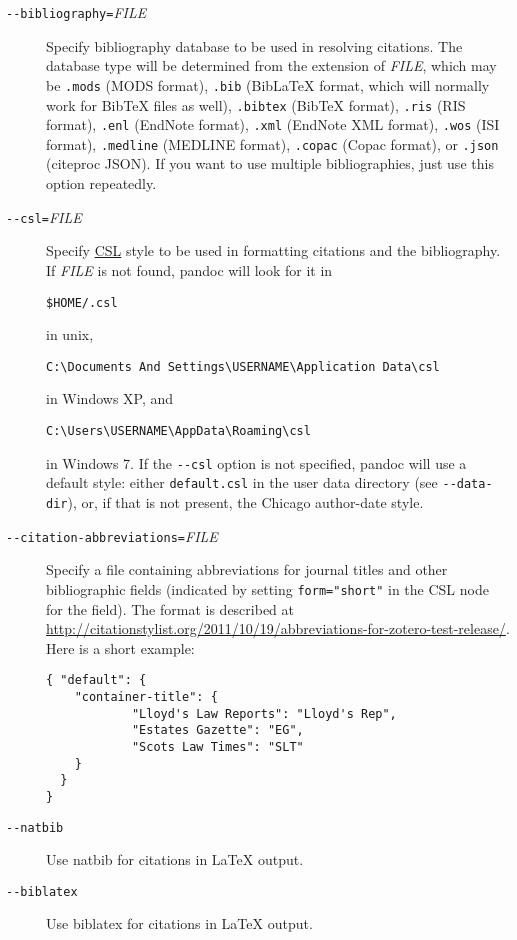 \documentclass[]{article}
\begin{document}
\begin{description}
\item[\texttt{-{}-bibliography=}\emph{FILE}]
Specify bibliography database to be used in resolving citations. The
database type will be determined from the extension of \emph{FILE},
which may be \texttt{.mods} (MODS format), \texttt{.bib} (BibLaTeX
format, which will normally work for BibTeX files as well),
\texttt{.bibtex} (BibTeX format), \texttt{.ris} (RIS format),
\texttt{.enl} (EndNote format), \texttt{.xml} (EndNote XML format),
\texttt{.wos} (ISI format), \texttt{.medline} (MEDLINE format),
\texttt{.copac} (Copac format), or \texttt{.json} (citeproc JSON). If
you want to use multiple bibliographies, just use this option
repeatedly.
\item[\texttt{-{}-csl=}\emph{FILE}]
Specify \href{http://CitationStyles.org}{CSL} style to be used in
formatting citations and the bibliography. If \emph{FILE} is not found,
pandoc will look for it in

\begin{verbatim}
$HOME/.csl
\end{verbatim}

in unix,

\begin{verbatim}
C:\Documents And Settings\USERNAME\Application Data\csl
\end{verbatim}

in Windows XP, and

\begin{verbatim}
C:\Users\USERNAME\AppData\Roaming\csl
\end{verbatim}

in Windows 7. If the \texttt{-{}-csl} option is not specified, pandoc
will use a default style: either \texttt{default.csl} in the user data
directory (see \texttt{-{}-data-dir}), or, if that is not present, the
Chicago author-date style.
\item[\texttt{-{}-citation-abbreviations=}\emph{FILE}]
Specify a file containing abbreviations for journal titles and other
bibliographic fields (indicated by setting \texttt{form="short"} in the
CSL node for the field). The format is described at
\url{http://citationstylist.org/2011/10/19/abbreviations-for-zotero-test-release/}.
Here is a short example:

\begin{verbatim}
{ "default": {
    "container-title": {
            "Lloyd's Law Reports": "Lloyd's Rep",
            "Estates Gazette": "EG",
            "Scots Law Times": "SLT"
    }
  }
}
\end{verbatim}
\item[\texttt{-{}-natbib}]
Use natbib for citations in LaTeX output.
\item[\texttt{-{}-biblatex}]
Use biblatex for citations in LaTeX output.
\end{description}
\end{document}
